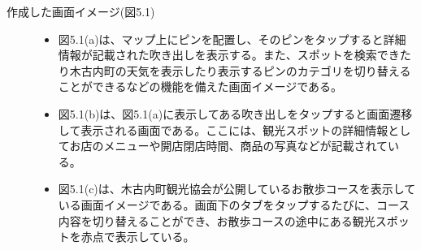 \begin{description}
\item[作成した画面イメージ(図5.1)]\mbox{}
\begin{itemize}
 \item 図5.1(a)は、マップ上にピンを配置し、そのピンをタップすると詳細情報が記載された吹き出しを表示する。また、スポットを検索できたり木古内町の天気を表示したり表示するピンのカテゴリを切り替えることができるなどの機能を備えた画面イメージである。
 \item 図5.1(b)は、図5.1(a)に表示してある吹き出しをタップすると画面遷移して表示される画面である。ここには、観光スポットの詳細情報としてお店のメニューや開店閉店時間、商品の写真などが記載されている。
 \item 図5.1(c)は、木古内町観光協会が公開しているお散歩コースを表示している画面イメージである。画面下のタブをタップするたびに、コース内容を切り替えることができ、お散歩コースの途中にある観光スポットを赤点で表示している。
\end{itemize}
\end{description}

